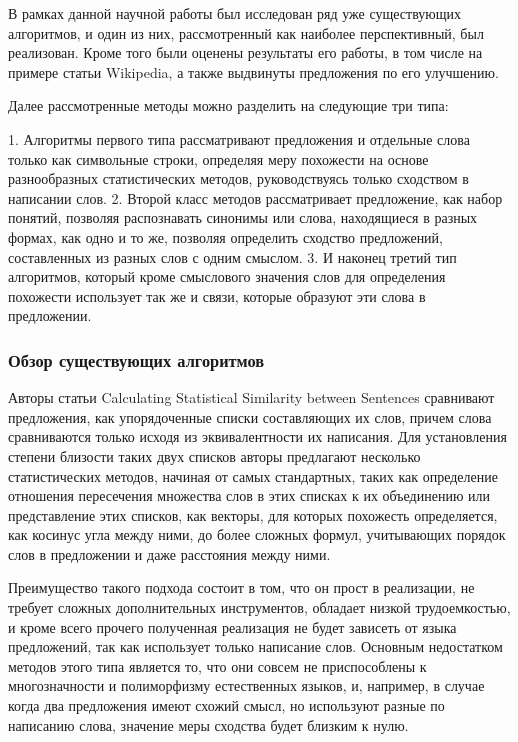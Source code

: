 В рамках данной научной работы был исследован ряд уже существующих алгоритмов,
и один из них, рассмотренный как наиболее перспективный, был реализован.
Кроме того были оценены результаты его работы, в том числе на примере статьи Wikipedia, 
а также выдвинуты предложения по его улучшению.

Далее рассмотренные методы можно разделить на следующие три типа:

1. Алгоритмы первого типа\cite{statisticalSim} рассматривают предложения и отдельные слова только как символьные строки, 
определяя меру похожести на основе разнообразных статистических методов, руководствуясь только сходством в написании слов.
2. Второй класс методов\cite{wordnetSim} рассматривает предложение, как набор понятий, позволяя распознавать синонимы 
или слова, находящиеся в разных формах, как одно и то же, позволяя определить сходство предложений, 
составленных из разных слов с одним смыслом.
3. И наконец третий тип алгоритмов\cite{weightedDep}\cite{complexSim}, который кроме смыслового значения слов для определения похожести
использует так же и связи, которые образуют эти слова в предложении.

\subsubsection{Обзор существующих алгоритмов}

Авторы статьи Calculating Statistical Similarity between Sentences\cite{statisticalSim} сравнивают предложения, 
как упорядоченные списки составляющих их слов, причем слова сравниваются только исходя из эквивалентности их написания. 
Для установления степени близости таких двух списков авторы предлагают несколько статистических методов,
начиная от самых стандартных, таких как определение отношения пересечения множества слов в этих списках к их объединению
или представление этих списков, как векторы, для которых похожесть определяется, как косинус угла между ними,
до более сложных формул, учитывающих порядок слов в предложении и даже расстояния между ними.

Преимущество такого подхода состоит в том, что он прост в реализации, не требует
сложных дополнительных инструментов, обладает низкой трудоемкостью, и кроме всего
прочего полученная реализация не будет зависеть от языка предложений, 
так как использует только написание слов.
Основным недостатком методов этого типа является то, что они совсем
не приспособлены к многозначности и полиморфизму естественных языков, и,
например, в случае когда два предложения имеют схожий смысл, но используют разные по написанию слова,
значение меры сходства будет близким к нулю.

